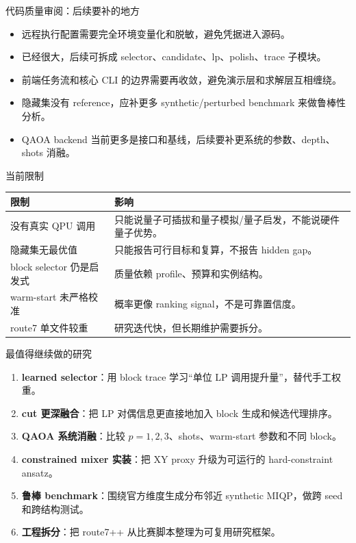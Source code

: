 \documentclass[aspectratio=169]{beamer}
\begin{document}
\begin{frame}{代码质量审阅：后续要补的地方}
\small
\begin{itemize}
  \item 远程执行配置需要完全环境变量化和脱敏，避免凭据进入源码。
  \item {} 已经很大，后续可拆成 selector、candidate、lp、polish、trace 子模块。
  \item 前端任务流和核心 CLI 的边界需要再收敛，避免演示层和求解层互相缠绕。
  \item 隐藏集没有 reference，应补更多 synthetic/perturbed benchmark 来做鲁棒性分析。
  \item QAOA backend 当前更多是接口和基线，后续要补更系统的参数、depth、shots 消融。
\end{itemize}
\end{frame}

\begin{frame}{当前限制}
\small
\begin{tabularx}{\linewidth}{p{3.3cm}Y}
\toprule
限制 & 影响 \\
\midrule
没有真实 QPU 调用 & 只能说量子可插拔和量子模拟/量子启发，不能说硬件量子优势。\\
隐藏集无最优值 & 只能报告可行目标和复算，不报告 hidden gap。\\
block selector 仍是启发式 & 质量依赖 profile、预算和实例结构。\\
warm-start 未严格校准 & 概率更像 ranking signal，不是可靠置信度。\\
route7 单文件较重 & 研究迭代快，但长期维护需要拆分。\\
\bottomrule
\end{tabularx}
\end{frame}

\begin{frame}{最值得继续做的研究}
\small
\begin{enumerate}
  \item \textbf{learned selector}：用 block trace 学习“单位 LP 调用提升量”，替代手工权重。
  \item \textbf{cut 更深融合}：把 LP 对偶信息更直接地加入 block 生成和候选代理排序。
  \item \textbf{QAOA 系统消融}：比较 $p=1,2,3$、shots、warm-start 参数和不同 block。
  \item \textbf{constrained mixer 实装}：把 XY proxy 升级为可运行的 hard-constraint ansatz。
  \item \textbf{鲁棒 benchmark}：围绕官方维度生成分布邻近 synthetic MIQP，做跨 seed 和跨结构测试。
  \item \textbf{工程拆分}：把 route7++ 从比赛脚本整理为可复用研究框架。
\end{enumerate}
\end{frame}
\end{document}
